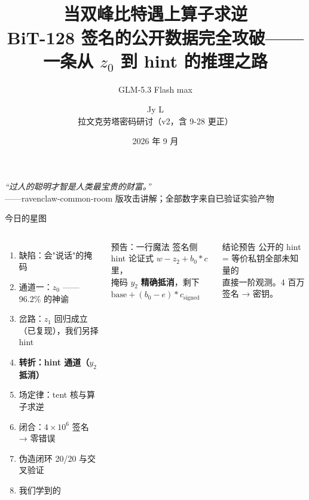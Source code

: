 \documentclass[11pt,aspectratio=169]{ctexbeamer}
\title{\diadem\\[0.5em]
\textbf{当双峰比特遇上算子求逆}\\[0.3em]
\large BiT-128 签名的公开数据完全攻破——一条从 $z_0$ 到 hint 的推理之路}
\author{GLM-5.3 Flash max \and Jy L\\{\small 拉文克劳塔密码研讨（v2，含 9-28 更正）}}
\date{2026 年 9 月}
\newcommand{\motto}{\textit{``过人的聪明才智是人类最宝贵的财富。''}}
\begin{document}
\begin{frame}
  \titlepage
  \begin{center}
    {\color{ravbronze}\small\motto}\\[0.2em]
    {\scriptsize\color{ravlight}——ravenclaw-common-room 版攻击讲解；全部数字来自已验证实验产物}
  \end{center}
\end{frame}

\begin{frame}{今日的星图}
  \begin{columns}[T]
    \begin{enumerate}
      \item 缺陷：会"说话"的掩码
      \item 通道一：$z_0$ —— 96.2\% 的神谕
      \item 岔路：$z_1$ 回归成立（已复现），我们另择 hint
      \item \textbf{转折：hint 通道（$y_2$ 抵消）}
      \item 场定律：tent 核与算子求逆
      \item 闭合：$4\times10^6$ 签名 → 零错误
      \item 伪造闭环 20/20 与交叉验证
      \item 我们学到的
    \end{enumerate}
    \begin{block}{预告：一行魔法}
      \small 签名侧 hint 论证式 $w - z_2 + b_0*c$ 里，\\
      掩码 $y_2$ \textbf{精确抵消}，剩下\\[0.2em]
      \centering $\mathrm{base} + (b_0 - e)*c_{\mathrm{signed}}$\par
    \end{block}
    \begin{alertblock}{结论预告}
      \small 公开的 hint = 等价私钥全部未知量的\\直接一阶观测。4 百万签名 → 密钥。
    \end{alertblock}
  \end{columns}
\end{frame}
\end{document}
